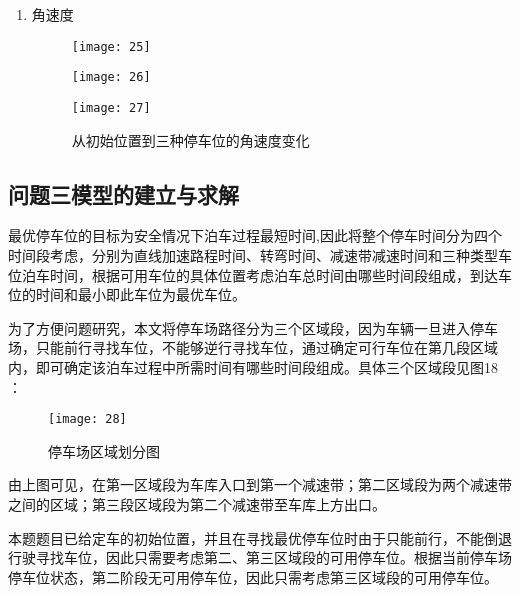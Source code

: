 \documentclass{MathorCupmodeling}
\begin{document}
\begin{enumerate}
\begin{enumerate}
			  \item 角速度
			  \begin{figure}[H]
				\centering
				\begin{minipage}[c]{0.325\textwidth}
					\centering
					\texttt{[image: 25]}
					\label{fig:sample-figure-a}
				\end{minipage}
				\begin{minipage}[c]{0.325\textwidth}
					\centering
					\texttt{[image: 26]}
					\label{fig:sample-figure-c}
				\end{minipage}
				\begin{minipage}[c]{0.325\textwidth}
					\centering
					\texttt{[image: 27]}
					\label{fig:sample-figure-c}
				\end{minipage}
				\caption{从初始位置到三种停车位的角速度变化}
				\label{fig:sample-figure}
			\end{figure}
		  \end{enumerate}

	\end{enumerate}
	



	\subsection{问题三模型的建立与求解}
	最优停车位的目标为安全情况下泊车过程最短时间,因此将整个停车时间分为四个时间段考虑，分别为直线加速路程时间、转弯时间、减速带减速时间和三种类型车位泊车时间，根据可用车位的具体位置考虑泊车总时间由哪些时间段组成，到达车位的时间和最小即此车位为最优车位。

	为了方便问题研究，本文将停车场路径分为三个区域段，因为车辆一旦进入停车场，只能前行寻找车位，不能够逆行寻找车位，通过确定可行车位在第几段区域内，即可确定该泊车过程中所需时间有哪些时间段组成。具体三个区域段见图18 ：

	\begin{figure}[h]
		\centering
		\texttt{[image: 28]}
		\caption{停车场区域划分图}
		\label{fig:circuit-diagram}
	\end{figure}


	由上图可见，在第一区域段为车库入口到第一个减速带；第二区域段为两个减速带之间的区域；第三段区域段为第二个减速带至车库上方出口。

	本题题目已给定车的初始位置，并且在寻找最优停车位时由于只能前行，不能倒退行驶寻找车位，因此只需要考虑第二、第三区域段的可用停车位。根据当前停车场停车位状态，第二阶段无可用停车位，因此只需考虑第三区域段的可用停车位。
\end{document}
